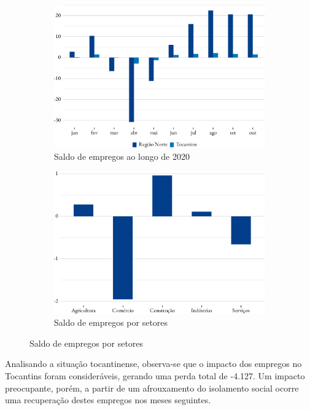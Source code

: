 \begin{figure}[!h]
	\begin{subfigure}{\linewidth}
		\caption{Saldo de empregos ao longo de 2020}
		\includegraphics{fig/saldo-1.pdf}
	\end{subfigure}
	\begin{subfigure}{\linewidth}
		\caption{Saldo de empregos por setores}
		\includegraphics{fig/saldo_setor_to-1.pdf}
	\end{subfigure}
\end{figure}

\par Analisando a situação tocantinense, observa-se que o impacto dos
empregos no Tocantins foram consideráveis, gerando uma perda total de -4.127. Um impacto preocupante, porém, a partir de um afrouxamento do isolamento social ocorre uma recuperação destes empregos nos meses seguintes.


